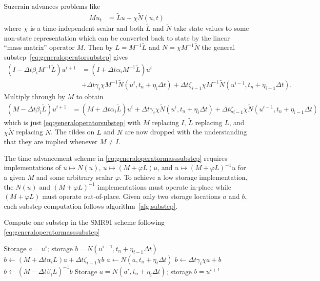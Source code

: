 \documentclass[letterpaper,11pt,nointlimits,reqno,draft]{amsbook}
\begin{document}
Suzerain advances problems like
\begin{align}
  \label{eq:timediscretization_mass_chi}
  Mu_{t}
  &=
  \tilde{L}u+\chi\tilde{N}\left( u,t \right)
\end{align}
where $\chi$ is a time-independent scalar and both $\tilde{L}$ and $\tilde{N}$
take state values to some non-state representation which can be converted back
to state by the linear ``mass matrix'' operator $M$.  Then by
$L=M^{-1}\tilde{L}$ and $N=\chi{}M^{-1}\tilde{N}$ the general
substep~\eqref{eq:generaloperatorsubstep} gives
\begin{align}
  \left(I - \Delta{}t\beta_{i}M^{-1}\tilde{L}\right) u^{i+1}
  &=
  \left(I + \Delta{}t\alpha_{i}M^{-1}\tilde{L}\right) u^{i}
\\
  &+ \Delta{}t\gamma_{i}\chi{}M^{-1}
    \tilde{N}\left(u^{i}, t_{n}+\eta_{i}\Delta{}t\right)
  + \Delta{}t\zeta_{i-1}\chi{}M^{-1}
    \tilde{N}\left(u^{i-1}, t_{n}+\eta_{i-1}\Delta{}t\right)
  .
\end{align}
Multiply through by $M$ to obtain
\begin{align}
  \left(M - \Delta{}t\beta_{i}\tilde{L}\right) u^{i+1}
  &=
  \left(M + \Delta{}t\alpha_{i}\tilde{L}\right) u^{i}
  + \Delta{}t\gamma_{i}\chi{}
    \tilde{N}\left(u^{i}, t_{n}+\eta_{i}\Delta{}t\right)
  + \Delta{}t\zeta_{i-1}\chi{}
    \tilde{N}\left(u^{i-1}, t_{n}+\eta_{i-1}\Delta{}t\right)
  \label{eq:generaloperatormasssubstep}
\end{align}
which is just \eqref{eq:generaloperatorsubstep} with $M$ replacing $I$,
$\tilde{L}$ replacing $L$, and $\chi{}\tilde{N}$ replacing $N$.  The tildes on
$L$ and $N$ are now dropped with the understanding that they are implied
whenever $M\neq{}I$.

The time advancement scheme in \eqref{eq:generaloperatormasssubstep} requires
implementations of $u\mapsto{}{N}\left(u\right)$,
$u\mapsto{}\left(M+\varphi{}L\right)u$, and
$u\mapsto{}\left(M+\varphi{}L\right)^{-1}u$ for a given $M$ and some arbitrary
scalar $\varphi$.  To achieve a low storage implementation, the
$N\left(u\right)$ and $\left(M+\varphi{}L\right)^{-1}$ implementations must
operate in-place while $\left(M+\varphi{}L\right)$ must operate out-of-place.
Given only two storage locations $a$ and $b$, each substep computation follows
algorithm~\vref{alg:substep}.

\begin{algorithm}
\label{alg:substep}
\caption{Compute one substep in the SMR91 scheme following
         \autoref{eq:generaloperatormasssubstep}
         }
\begin{algorithmic}
  \REQUIRE Storage $a = u^i$;
           storage $b = N\left(u^{i-1},t_{n}+\eta_{i-1}\Delta{}t\right)$
  \STATE $b\leftarrow{}   \left(M+\Delta{}t\alpha_{i}L\right)a
                        + \Delta{}t\zeta_{i-1}\chi{}b$
  \STATE $a\leftarrow{}N\left(a,t_{n}+\eta_{i}\Delta{}t\right)$
  \STATE $b\leftarrow{}\Delta{}t\gamma_{i}\chi{}a + b$
  \STATE $b\leftarrow{}\left(M-\Delta{}t\beta_{i}L\right)^{-1}b$
  \ENSURE Storage $a = N\left(u^{i},t_{n}+\eta_{i}\Delta{}t\right)$;
          storage $b = u^{i+1}$
\end{algorithmic}
\end{algorithm}
\end{document}
